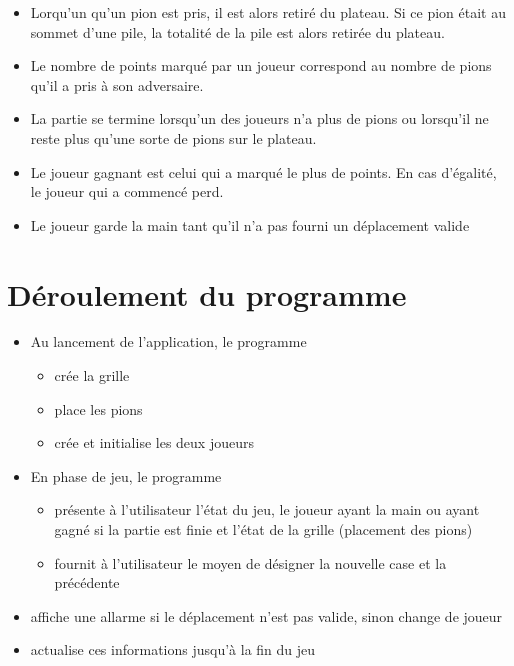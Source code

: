 \documentclass[12pt]{article}
\begin{document}
\begin{itemize}
\item Lorqu'un qu'un pion est pris, il est alors retiré du plateau. Si ce pion était au sommet d'une pile, la totalité de la pile est alors retirée du plateau. 
\item Le nombre de points marqué par un joueur correspond au nombre de pions qu'il a pris à son adversaire.
\item La partie se termine lorsqu'un des joueurs n'a plus de pions ou lorsqu'il ne reste plus qu'une sorte de pions sur le plateau.
\item Le joueur gagnant est celui qui a marqué le plus de points. En cas d'égalité, le joueur qui a commencé perd.
\item Le joueur garde la main tant qu'il n'a pas fourni un déplacement valide
\end{itemize}

\section{Déroulement du programme}
 \begin{itemize}
 \item Au lancement de l'application, le programme
 \begin{itemize}
  \item[\textbullet] crée la grille
  \item[\textbullet] place les pions
  \item[\textbullet] crée et initialise les deux joueurs
 \end{itemize}
 \item En phase de jeu, le programme
 \begin{itemize}
  \item[\textbullet] présente à l'utilisateur l'état du jeu, le joueur ayant la main ou ayant gagné si la partie est finie et l'état de la grille (placement des pions)
  \item[\textbullet] fournit à l'utilisateur le moyen de désigner la nouvelle case et la précédente
  \end{itemize}
 
  \item affiche une allarme si le déplacement n'est pas valide, sinon change de joueur
  \item actualise ces informations jusqu'à la fin du jeu
 \end{itemize}
\end{document}
